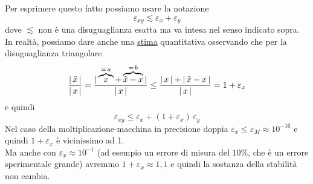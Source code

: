 Per esprimere questo fatto possiamo usare la notazione \[\varepsilon_{xy} \lesssim \varepsilon_x + \varepsilon_y \]
dove $\lesssim$ non è una disuguaglianza esatta ma va intesa nel senso indicato sopra. \\
In realtà, possiamo dare anche una \uline{stima} quantitativa osservando che per la disuguaglianza triangolare 
\[ \frac{\lvert \,\Tilde{x}\, \rvert}{\lvert \,x\, \rvert} = \frac{\lvert \, \overbrace{x}^{=\,a} + \overbrace{\Tilde{x} - x}^{=\,b} \, \rvert}{\lvert\, x \, \rvert} \le \frac{\lvert \, x \, \rvert + \lvert \,\Tilde{x} - x\, \rvert}{\lvert\, x \, \rvert} = 1 + \varepsilon_x\]
e quindi \[ \varepsilon_{xy} \le \varepsilon_x + (1 + \varepsilon_x)\,\varepsilon_y\]
Nel caso della moltiplicazione-macchina in precisione doppia $\varepsilon_x \le \varepsilon_M \approx 10^{-16}$ e quindi $1 + \varepsilon_x$ è vicinissimo ad 1.\\
Ma anche con $\varepsilon_x \approx 10^{-1}$ (ad esempio un errore di misura del $10\%$, che è un errore sperimentale grande) avremmo $1 + \varepsilon_x \approx 1,1$ e quindi la sostanza della stabilità non cambia.

